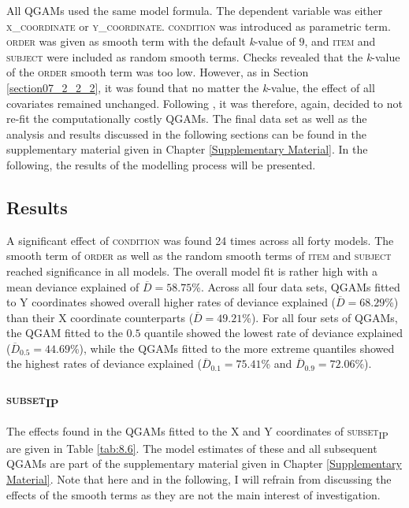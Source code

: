 All QGAMs used the same model formula. The dependent variable was either \textsc{x\_coordinate} or \textsc{y\_coordinate}. \textsc{condition} was introduced as parametric term. \textsc{order} was given as smooth term with the default \textit{k}-value of $9$, and \textsc{item} and \textsc{subject} were included as random smooth terms. Checks revealed that the \textit{k}-value of the \textsc{order} smooth term was too low. However, as in Section \ref{section07_2_2_2}, it was found that no matter the \textit{k}-value, the effect of all covariates remained unchanged. Following \citet{Wood2017}, it was therefore, again, decided to not re-fit the computationally costly QGAMs. The final data set as well as the analysis and results discussed in the following sections can be found in the supplementary material given in Chapter \ref{Supplementary Material}. In the following, the results of the modelling process will be presented.

\subsection{Results}\label{section08_2_2}

A significant effect of \textsc{condition} was found 24 times across all forty models. The smooth term of \textsc{order} as well as the random smooth terms of \textsc{item} and \textsc{subject} reached significance in all models. The overall model fit is rather high with a mean deviance explained of $\overline{D}=58.75$\%. Across all four data sets, QGAMs fitted to Y coordinates showed overall higher rates of deviance explained ($\overline{D}=68.29$\%) than their X coordinate counterparts ($\overline{D}=49.21$\%). For all four sets of QGAMs, the QGAM fitted to the $0.5$ quantile showed the lowest rate of deviance explained ($\overline{D}_{0.5}=44.69$\%), while the QGAMs fitted to the more extreme quantiles showed the highest rates of deviance explained ($\overline{D}_{0.1}=75.41$\% and $\overline{D}_{0.9}=72.06$\%).

\subsubsection{\textsc{subset\textsubscript{IP}}}\label{section08_2_2_1}

The effects found in the QGAMs fitted to the X and Y coordinates of \textsc{subset\textsubscript{IP}} are given in Table \ref{tab:8.6}. The model estimates of these and all subsequent QGAMs are part of the supplementary material given in Chapter \ref{Supplementary Material}. Note that here and in the following, I will refrain from discussing the effects of the smooth terms as they are not the main interest of investigation. 

